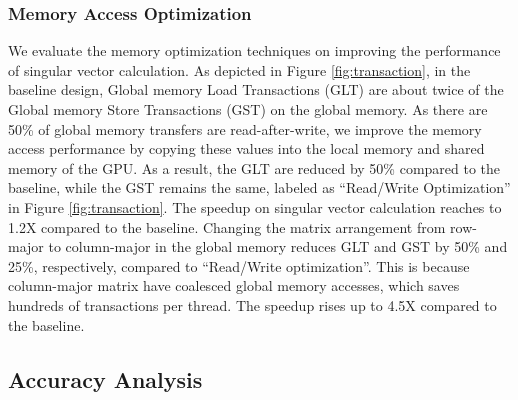 \subsubsection{Memory Access Optimization}
We evaluate the memory optimization techniques on improving the performance
of singular vector calculation. As depicted in Figure \ref{fig:transaction},
in the baseline design,
Global memory Load Transactions (GLT) are about twice of the Global memory Store Transactions (GST) on the global memory.
As there are 50\% of global memory transfers are read-after-write, we improve the memory access performance by copying these values into the local memory and shared memory of the GPU. As a result, the GLT are reduced by 50\% compared to the baseline, while the GST remains the same, labeled as ``Read/Write Optimization'' in Figure \ref{fig:transaction}. The speedup on singular vector calculation reaches to 1.2X compared to the baseline.
Changing the matrix arrangement from row-major to column-major in the global memory 
reduces GLT and GST by 50\% and 25\%, respectively, compared to ``Read/Write optimization''. 
This is because column-major matrix have coalesced global memory accesses, which saves hundreds of transactions per thread. The speedup rises up to 4.5X compared to the baseline.

\subsection{Accuracy Analysis}
